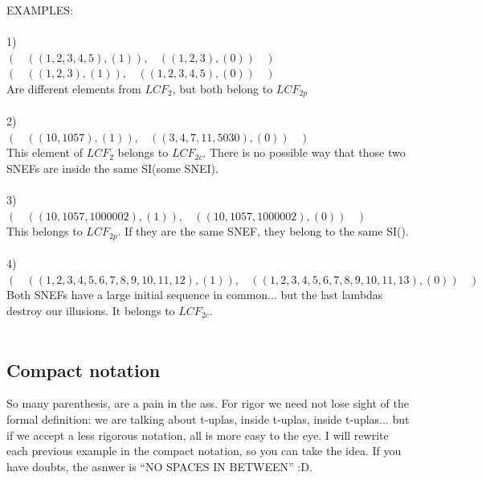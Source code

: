 		\noindent
		EXAMPLES:\\\\
		1)\\
		$(  \:\:\:\:  ((1,2,3,4,5), (1)), \:\:\:\: ((1,2,3), (0))  \:\:\:\:)$\\
		$(  \:\:\:\:  ((1,2,3), (1)), \:\:\:\: ((1,2,3,4,5), (0))  \:\:\:\:)$\\
		Are different elements from $LCF_{2}$, but both belong to $LCF_{2p}$\\\\
		2)\\
		$(  \:\:\:\:  ((10, 1057), (1)), \:\:\:\: ((3,4,7,11,5030), (0))  \:\:\:\:)$\\
		This element of $LCF_{2}$ belongs to $LCF_{2c}$. There is no possible way that those two SNEFs are inside the same SI(some SNEI).\\\\
		3)\\
		$(  \:\:\:\:  ((10, 1057, 1000002), (1)), \:\:\:\: ((10, 1057, 1000002), (0))  \:\:\:\:)$\\
		This belongs to $LCF_{2p}$. If they are the same SNEF, they belong to the same SI().\\\\
		4)\\
		$(  \:\:\:\:  ((1,2,3,4,5,6,7,8,9,10,11,12), (1)), \:\:\:\: ((1,2,3,4,5,6,7,8,9,10,11,13), (0))  \:\:\:\:)$\\
		Both SNEFs have a large initial sequence in common... but the last lambdas destroy our illusions. It belongs to $LCF_{2c}$.
		\\\\
		
		\subsection{Compact notation}
		
			\noindent
			So many parenthesis, are a pain in the ass. For rigor we need not lose sight of the formal definition: we are talking about t-uplas, inside t-uplas, inside t-uplas... but if we accept a less rigorous notation, all is more easy to the eye. I will rewrite each previous example in the compact notation, so you can take the idea. If you have doubts, the asnwer is ``NO SPACES IN BETWEEN'' :D.
			\\\\
			
